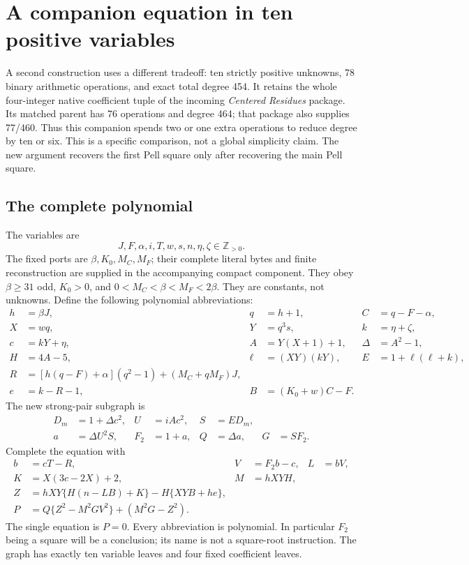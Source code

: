 \section{A companion equation in ten positive variables}
\label{sec:compactcompanion}

A second construction uses a different tradeoff: ten strictly positive
unknowns, 78 binary arithmetic operations, and exact total degree 454.
It retains the whole four-integer native coefficient tuple of the incoming
\emph{Centered Residues} package. Its matched parent has 76 operations and
degree 464; that package also supplies 77/460. Thus this companion spends
two or one extra operations to reduce degree by ten or six. This is a
specific comparison, not a global simplicity claim. The new argument
recovers the first Pell square only after recovering the main Pell square.

\subsection{The complete polynomial}

The variables are
\[
 J,F,\alpha,i,T,w,s,n,\eta,\zeta\in\mathbb Z_{>0}.
\]
The fixed ports are \(\beta,K_0,M_C,M_F\); their complete literal bytes
and finite reconstruction are supplied in the accompanying compact
component. They obey \(\beta\ge31\) odd, \(K_0>0\), and
\(0<M_C<\beta<M_F<2\beta\). They are constants, not unknowns.
Define the following polynomial abbreviations:
\begin{align*}
 h&=\beta J,&q&=h+1,&C&=q-F-\alpha,\\
 X&=wq,&Y&=q^3s,&k&=\eta+\zeta,\\
 c&=kY+\eta,&A&=Y(X+1)+1,&\Delta&=A^2-1,\\
 H&=4A-5,&\ell&=(XY)(kY),&E&=1+\ell(\ell+k),\\
 R&=[h(q-F)+\alpha](q^2-1)+(M_C+qM_F)J,\\
 e&=k-R-1,& B&=(K_0+w)C-F.
\end{align*}
The new strong-pair subgraph is
\begin{align*}
 D_m&=1+\Delta c^2,&U&=iAc^2,&S&=ED_m,\\
 a&=\Delta U^2S,&F_2&=1+a,&Q&=\Delta a,&G&=SF_2.
\end{align*}
Complete the equation with
\begin{align*}
 b&=cT-R,&V&=F_2b-c,&L&=bV,\\
 K&=X(3c-2X)+2,&M&=hXYH,\\
 Z&=hXY\{H(n-LB)+K\}-H\{XYB+he\},\\
 P&=Q\{Z^2-M^2GV^2\}+(M^2G-Z^2).
\end{align*}
The single equation is \(P=0\). Every abbreviation is polynomial. In
particular \(F_2\) being a square will be a conclusion; its name is not
a square-root instruction. The graph has exactly ten variable leaves
and four fixed coefficient leaves.


